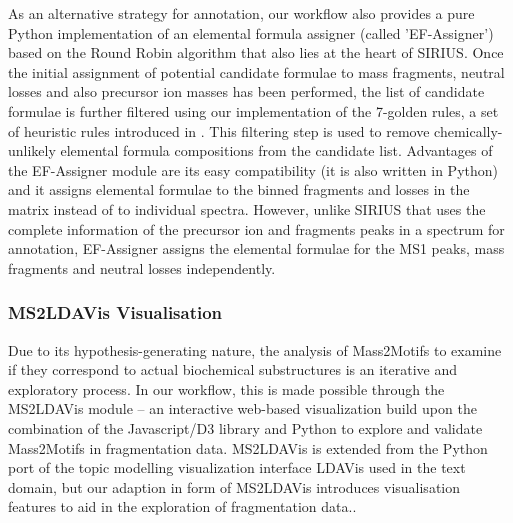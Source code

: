 As an alternative strategy for annotation, our workflow also provides a pure Python implementation of an elemental formula assigner (called 'EF-Assigner') based on the Round Robin algorithm that also lies at the heart of SIRIUS. Once the initial assignment of potential candidate formulae to mass fragments, neutral losses and also precursor ion masses has been performed, the list of candidate formulae is further filtered using our implementation of the 7-golden rules, a set of heuristic rules introduced in \cite{Kind2007}. This filtering step is used to remove chemically-unlikely elemental formula compositions from the candidate list. Advantages of the EF-Assigner module are its easy compatibility (it is also written in Python) and it assigns elemental formulae to the binned fragments and losses in the matrix instead of to individual spectra. However, unlike SIRIUS that uses the complete information of the precursor ion and fragments peaks in a spectrum for annotation, EF-Assigner assigns the elemental formulae for the MS1 peaks, mass fragments and neutral losses independently. 

\subsubsection{MS2LDAVis Visualisation}

Due to its hypothesis-generating nature, the analysis of Mass2Motifs to examine if they correspond to actual biochemical substructures is an iterative and exploratory process. In our workflow, this is made possible through the MS2LDAVis module -- an interactive web-based visualization build upon the combination of the Javascript/D3 library and Python to explore and validate Mass2Motifs in fragmentation data. MS2LDAVis is extended from the Python port of the topic modelling visualization interface LDAVis \cite{Sievert2014} used in the text domain, but our adaption in form of MS2LDAVis introduces visualisation features to aid in the exploration of fragmentation data..

